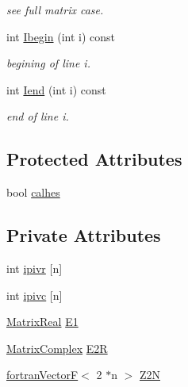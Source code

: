 \begin{DoxyCompactItemize}
\begin{DoxyCompactList}\small\item\em see full matrix case. \end{DoxyCompactList}\item 
int \hyperlink{classodes_1_1Matrices_3_01false_00_01false_00_01n_00_01nsub_00_01nsup_01_4_af3db190a47f4afcaa895bcf222f56e67}{Ibegin} (int i) const 
\begin{DoxyCompactList}\small\item\em begining of line i. \end{DoxyCompactList}\item 
int \hyperlink{classodes_1_1Matrices_3_01false_00_01false_00_01n_00_01nsub_00_01nsup_01_4_a65b1291c6d768f3d16d76308526754fb}{Iend} (int i) const 
\begin{DoxyCompactList}\small\item\em end of line i. \end{DoxyCompactList}\end{DoxyCompactItemize}
\subsection*{Protected Attributes}
\begin{DoxyCompactItemize}
\item 
bool \hyperlink{classodes_1_1Matrices_3_01false_00_01false_00_01n_00_01nsub_00_01nsup_01_4_a5aa7e9c4b65b072c0154ad5d2a7380db}{calhes}
\end{DoxyCompactItemize}
\subsection*{Private Attributes}
\begin{DoxyCompactItemize}
\item 
int \hyperlink{classodes_1_1Matrices_3_01false_00_01false_00_01n_00_01nsub_00_01nsup_01_4_aba28cdecbe597fc332619e74ffb1105f}{ipivr} \mbox{[}n\mbox{]}
\item 
int \hyperlink{classodes_1_1Matrices_3_01false_00_01false_00_01n_00_01nsub_00_01nsup_01_4_abd366955b1f19637336f72fa93f2b796}{ipivc} \mbox{[}n\mbox{]}
\item 
\hyperlink{classodes_1_1Matrices_3_01false_00_01false_00_01n_00_01nsub_00_01nsup_01_4_a16870437fa110da1b60636c6e108b357}{Matrix\+Real} \hyperlink{classodes_1_1Matrices_3_01false_00_01false_00_01n_00_01nsub_00_01nsup_01_4_aa9c25553fefa37ddf1524d2b8d098b1e}{E1}
\item 
\hyperlink{classodes_1_1Matrices_3_01false_00_01false_00_01n_00_01nsub_00_01nsup_01_4_aeedabda8f5222d638b092cd1e4cf55f0}{Matrix\+Complex} \hyperlink{classodes_1_1Matrices_3_01false_00_01false_00_01n_00_01nsub_00_01nsup_01_4_a1709aa93fc81756470531e682cb6ef16}{E2\+R}
\item 
\hyperlink{classodes_1_1fortranVectorF}{fortran\+Vector\+F}$<$ 2 $\ast$n $>$ \hyperlink{classodes_1_1Matrices_3_01false_00_01false_00_01n_00_01nsub_00_01nsup_01_4_a1e70bb1cfd110fc9ae14f8ecd66cbc85}{Z2\+N}
\end{DoxyCompactItemize}
